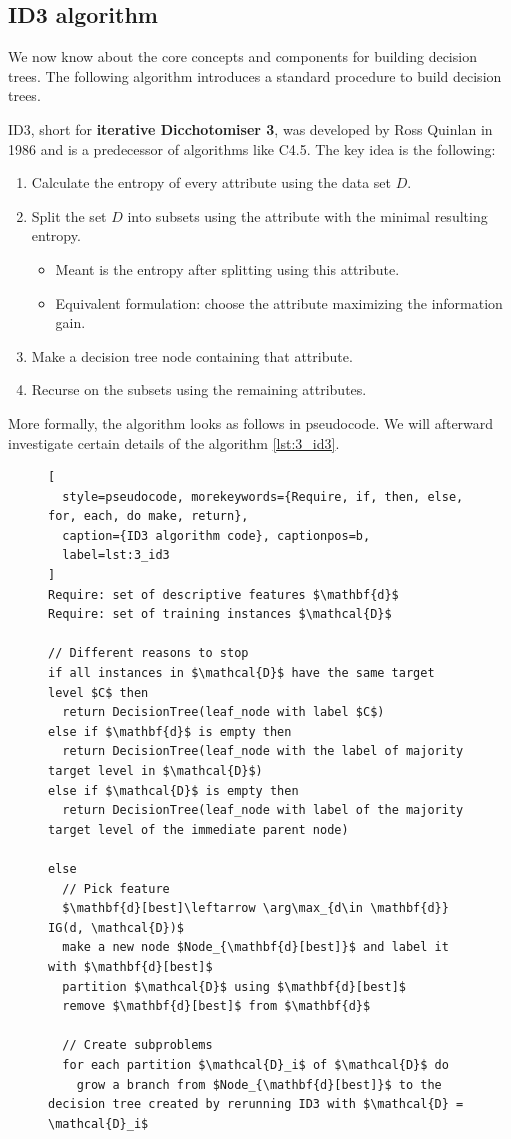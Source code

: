 \subsection{ID3 algorithm}
We now know about the core concepts and components for building decision trees. The following algorithm introduces a standard procedure to build decision trees. 

ID3, short for \textbf{iterative Dicchotomiser 3}, was developed by Ross Quinlan in 1986 and is a predecessor of algorithms like C4.5. The key idea is the following:
\begin{enumerate}
  \item Calculate the entropy of every attribute using the data set $D$.
  \item Split the set $D$ into subsets using the attribute with the minimal resulting entropy.
  \begin{itemize}
    \item Meant is the entropy after splitting using this attribute.
    \item Equivalent formulation: choose the attribute maximizing the information gain.
  \end{itemize}
  \item Make a decision tree node containing that attribute.
  \item Recurse on the subsets using the remaining attributes.
\end{enumerate}

More formally, the algorithm looks as follows in pseudocode. We will afterward investigate certain details of the algorithm \ref{lst:3_id3}.

\begin{figure}[h]
\begin{lstlisting}[
  style=pseudocode, morekeywords={Require, if, then, else, for, each, do make, return},
  caption={ID3 algorithm code}, captionpos=b,
  label=lst:3_id3
]
Require: set of descriptive features $\mathbf{d}$
Require: set of training instances $\mathcal{D}$

// Different reasons to stop
if all instances in $\mathcal{D}$ have the same target level $C$ then
  return DecisionTree(leaf_node with label $C$)
else if $\mathbf{d}$ is empty then
  return DecisionTree(leaf_node with the label of majority target level in $\mathcal{D}$)
else if $\mathcal{D}$ is empty then
  return DecisionTree(leaf_node with label of the majority target level of the immediate parent node)

else
  // Pick feature
  $\mathbf{d}[best]\leftarrow \arg\max_{d\in \mathbf{d}} IG(d, \mathcal{D})$
  make a new node $Node_{\mathbf{d}[best]}$ and label it with $\mathbf{d}[best]$
  partition $\mathcal{D}$ using $\mathbf{d}[best]$
  remove $\mathbf{d}[best]$ from $\mathbf{d}$

  // Create subproblems
  for each partition $\mathcal{D}_i$ of $\mathcal{D}$ do
    grow a branch from $Node_{\mathbf{d}[best]}$ to the decision tree created by rerunning ID3 with $\mathcal{D} = \mathcal{D}_i$
\end{lstlisting}
\end{figure}

